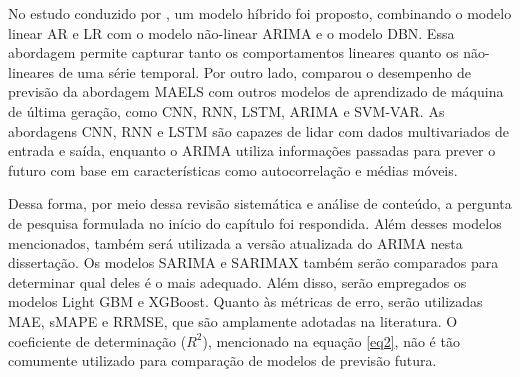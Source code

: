No estudo conduzido por , um modelo híbrido foi proposto, combinando o modelo linear AR e LR com o modelo não-linear ARIMA e o modelo DBN. Essa abordagem permite capturar tanto os comportamentos lineares quanto os não-lineares de uma série temporal. Por outro lado,  comparou o desempenho de previsão da abordagem MAELS com outros modelos de aprendizado de máquina de última geração, como CNN, RNN, LSTM, ARIMA e SVM-VAR. As abordagens CNN, RNN e LSTM são capazes de lidar com dados multivariados de entrada e saída, enquanto o ARIMA utiliza informações passadas para prever o futuro com base em características como autocorrelação e médias móveis.

Dessa forma, por meio dessa revisão sistemática e análise de conteúdo, a pergunta de pesquisa formulada no início do capítulo foi respondida.
Além desses modelos mencionados, também será utilizada a versão atualizada do ARIMA nesta dissertação. Os modelos SARIMA e SARIMAX também serão comparados para determinar qual deles é o mais adequado. Além disso, serão empregados os modelos Light GBM e XGBoost. Quanto às métricas de erro, serão utilizadas MAE, sMAPE e RRMSE, que são amplamente adotadas na literatura. O coeficiente de determinação ($R^2$), mencionado na equação \eqref{eq2}, não é tão comumente utilizado para comparação de modelos de previsão futura.